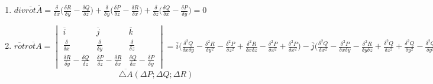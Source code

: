 \documentclass[12pt]{article}
\begin{document}
\begin{enumerate}
    \item $div \overline{rot}\overline{A} = \frac{\delta}{\delta x}\Big(\frac{\delta R}{\delta y}-\frac{\delta Q}{\delta z}\Big)
    + \frac{\delta}{\delta y}\Big(\frac{\delta P}{\delta z} - \frac{\delta R}{\delta x}\Big)+
    \frac{\delta}{\delta z }\Big(\frac{\delta Q}{\delta x} - \frac{\delta P}{\delta y}\Big)=0$

    \item $\overline{rot}\overline{rotA} =
    \begin{vmatrix}
      \overline{i} & \overline{j} & \overline{k}\\
      \frac{\delta}{\delta x} & \frac{\delta}{\delta y} & \frac{\delta}{\delta z}\\
      \frac{\delta R}{\delta y} - \frac{\delta Q}{\delta z} & 
      \frac{\delta P}{\delta z} - \frac{\delta R}{\delta x} &
      \frac{\delta Q}{\delta x} - \frac{\delta P}{\delta y}
    \end{vmatrix}
    =\overline{i}\Big(\frac{\delta^2 Q}{\delta x \delta y} - \frac{\delta^2 R}{\delta y^2}-
    \frac{\delta^2 P}{\delta z^2} + \frac{\delta^2 R}{\delta x \delta z}-\frac{\delta^2 P}{\delta x^2}+\frac{\delta^2 P}{\delta x^2}\Big)-
    \overline{j}\Big(\frac{\delta^2 Q}{\delta x^2} - \frac{\delta^2 P}{\delta x \delta y} - \frac{\delta^2 R}{\delta y \delta z} +
    \frac{\delta^2 Q}{\delta z^2}+\frac{\delta^2 Q}{\delta y^2}-\frac{\delta^2 Q}{\delta y^2}\Big)+
    \overline{k}\Big(\frac{\delta^2 P}{\delta x \delta z} - \frac{\delta^2 R}{\delta x^2} - \frac{\delta^2 R}{\delta y^2}+
    \frac{\delta^2 Q}{\delta y \delta z} - \frac{\delta^2 R}{\delta z^2}+ \frac{\delta^2 R}{\delta z^2}\Big)=
    \overline{i}\Big(\frac{\delta^2 P}{\delta x^2}+\frac{\delta^2 Q}{\delta x \delta y}+\frac{\delta^2 R}{\delta x \delta z}\Big)+
    \overline{j}\Big(\frac{\delta^2 Q}{\delta y^2}+\frac{\delta^2 P}{\delta x \delta y}+ \frac{\delta^2 R}{\delta y \delta z}\Big)+
    \overline{k}\Big(\frac{\delta^2 R}{\delta z^2}+\frac{\delta^2 P}{\delta x \delta z} + \frac{\delta^2 Q}{\delta y \delta z}\Big)-
    \overline{i}\Big(\frac{\delta^2 P}{\delta x^2}+\frac{\delta^2 P}{\delta y^2}+\frac{\delta^2 P}{\delta z^2}\Big)-
    \overline{j}\Big(\frac{\delta^2 Q}{\delta x^2}+\frac{\delta^2 Q}{\delta y^2}+\frac{\delta^2 Q}{\delta z^2}\Big)-
    \overline{j}\Big(\frac{\delta^2 R }{\delta x^2}+\frac{\delta^2 R}{\delta y^2}+\frac{\delta^2 R}{\delta z^2}\Big)=
    \overline{grad}div \overline{A}=\overline{\bigtriangleup A}$
    \[\overline{\bigtriangleup A}(\Delta P;\Delta Q;\Delta R)\]
\end{enumerate}
\end{document}
